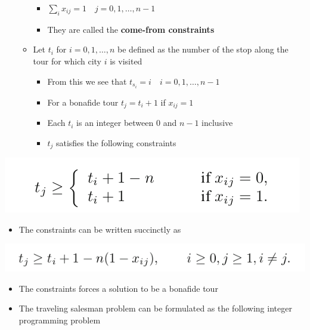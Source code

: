 \documentclass[11pt]{article}
\begin{document}
\begin{itemize}
\begin{itemize}
\begin{itemize}
\item \(\sum_{i} x_{ij} = 1 \quad j=0,1,\dots,n-1\)
\item They are called the \textbf{come-from constraints}
\end{itemize}
\item Let \(t_i\) for \(i=0,1,\dots, n\) be defined as the number of the stop along the tour for which city \(i\) is visited
\begin{itemize}
\item From this we see that \(t_{s_i} = i \quad i = 0,1,\dots,n-1\)
\item For a bonafide tour \(t_j = t_i +1\) if \(x_{ij} = 1\)
\item Each \(t_i\) is an integer between \(0\) and \(n-1\) inclusive
\item \(t_j\) satisfies the following constraints
\end{itemize}
\end{itemize}
\end{itemize}
\begin{center}
\includegraphics[width=.9\linewidth]{Integer Programming/screenshot_2019-02-17_10-03-58.png}
\end{center}
\begin{itemize}
\item The constraints can be written succinctly as
\end{itemize}
\begin{center}
\includegraphics[width=.9\linewidth]{Integer Programming/screenshot_2019-02-17_10-05-04.png}
\end{center}
\begin{itemize}
\item The constraints forces a solution to be a bonafide tour
\end{itemize}
\begin{itemize}
\item The traveling salesman problem can be formulated as the following integer programming problem
\end{itemize}
\end{document}
